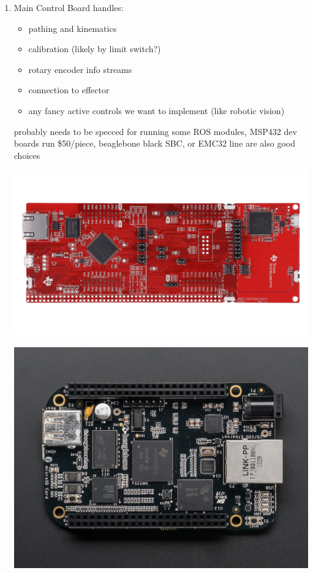 \documentclass[11pt]{article}
\begin{document}
\begin{enumerate}
\item Main Control Board
\label{sec:org862e556}
handles:
\begin{itemize}
\item pathing and kinematics
\item calibration (likely by limit switch?)
\item rotary encoder info streams
\item connection to effector
\item any fancy active controls we want to implement (like robotic vision)
\end{itemize}
probably needs to be specced for running some ROS modules, MSP432 dev boards run \$50/piece, beaglebone black SBC, or EMC32 line are also good choices
\begin{center}
\includegraphics[width=.9\linewidth]{Main_Control_Board/2022-07-18_14-30-59_screenshot.png}
\end{center}
\begin{center}
\includegraphics[width=.9\linewidth]{Main_Control_Board/2022-07-18_14-28-49_screenshot.png}
\end{center}


\end{enumerate}
\end{document}
